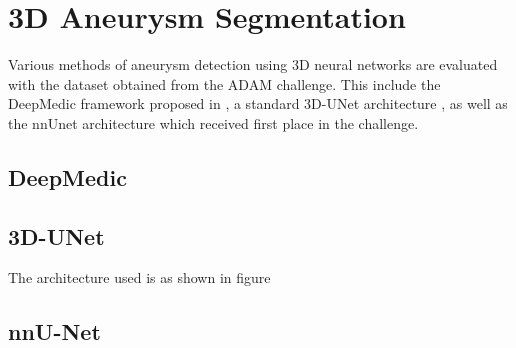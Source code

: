 \chapter{3D Aneurysm Segmentation}
Various methods of aneurysm detection using 3D neural networks are evaluated with the dataset obtained from the ADAM challenge. This include the DeepMedic framework proposed in \cite{Sichermann2019}, a standard 3D-UNet architecture \cite{3dunet}, as well as the nnUnet architecture \cite{nnUnet} which received first place in the challenge.


\section{DeepMedic}


\section{3D-UNet}
The architecture used is as shown in figure


\section{nnU-Net}



